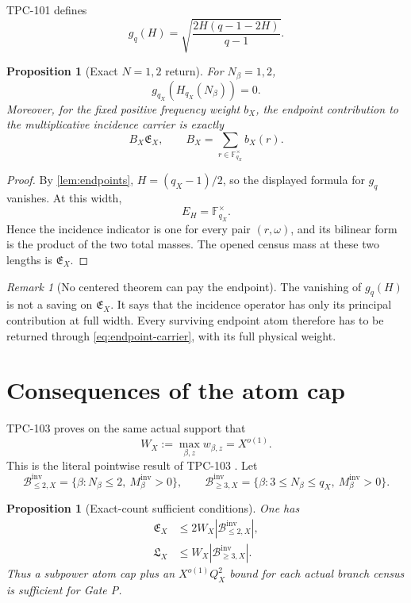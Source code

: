 \documentclass[11pt]{article}
\newtheorem{proposition}[theorem]{Proposition}
\theoremstyle{definition}
\theoremstyle{remark}
\newtheorem{remark}[theorem]{Remark}
\newcommand{\EX}{\mathfrak E_X}
\newcommand{\LX}{\mathfrak L_X}
\begin{document}
TPC-101 defines
\[
 g_q(H)=
 \sqrt{\frac{2H(q-1-2H)}{q-1}}.
\]

\begin{proposition}[Exact \(N=1,2\) return]
\label{prop:endpoint-return}
For \(N_\beta=1,2\),
\[
 g_{q_X}(H_{q_X}(N_\beta))=0.
\]
Moreover, for the fixed positive frequency weight \(b_X\),
the endpoint contribution to the multiplicative incidence carrier
is exactly
\begin{equation}
 B_X\EX,\qquad B_X=\sum_{r\in\mathbb F_{q_X}^\times}b_X(r).
\label{eq:endpoint-carrier}
\end{equation}
\end{proposition}

\begin{proof}
By \cref{lem:endpoints}, \(H=(q_X-1)/2\), so the displayed formula
for \(g_q\) vanishes.  At this width,
\[
 E_H=\mathbb F_{q_X}^\times.
\]
Hence the incidence indicator is one for every pair
\((r,\omega)\), and its bilinear form is the product of the two
total masses.  The opened census mass at these two lengths is
\(\EX\).
\end{proof}

\begin{remark}[No centered theorem can pay the endpoint]
The vanishing of \(g_q(H)\) is not a saving on \(\EX\).  It says
that the incidence operator has only its principal contribution at
full width.  Every surviving endpoint atom therefore has to be
returned through \eqref{eq:endpoint-carrier}, with its full physical
weight.
\end{remark}

\section{Consequences of the atom cap}
\label{sec:atom-cap}

TPC-103 proves on the same actual support that
\[
 W_X:=\max_{\beta,z}w_{\beta,z}=X^{o(1)}.
\]
This is the literal pointwise result of TPC-103
\citep{WangTPC103}.
Let
\[
 \mathcal B_{\le2,X}^{\mathrm{inv}}
 =
 \{\beta:N_\beta\le2,\ M_\beta^{\mathrm{inv}}>0\},
\qquad
 \mathcal B_{\ge3,X}^{\mathrm{inv}}
 =
 \{\beta:3\le N_\beta\le q_X,\
 M_\beta^{\mathrm{inv}}>0\}.
\]

\begin{proposition}[Exact-count sufficient conditions]
\label{prop:count}
One has
\begin{align}
 \EX
 &\le2W_X
 |\mathcal B_{\le2,X}^{\mathrm{inv}}|,
\label{eq:E-count}\\
 \LX
 &\le W_X
 |\mathcal B_{\ge3,X}^{\mathrm{inv}}|.
\label{eq:L-count}
\end{align}
Thus a subpower atom cap plus an
\(X^{o(1)}Q_X^2\) bound for each actual branch census is sufficient
for Gate P.
\end{proposition}
\end{document}
